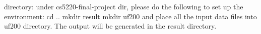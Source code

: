 directory:
under cs5220-final-project dir, please do the following to set up the environment:
	cd ..
	mkdir result
	mkdir uf200
and place all the input data files into uf200 directory. The output will be generated in the result directory.
